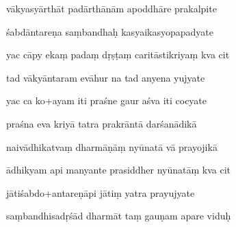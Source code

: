 \documentclass[article,12pt,a4paper]{memoir}%
\newcounter{parCount}
\begin{document}
	  
	  \pstart {} vākyasyārthāt padārthānām apoddhāre prakalpite 
	{}
	\pend%
      

	  
	  \pstart \leavevmode%
	śabdāntareṇa saṃbandhaḥ kasyaikasyopapadyate 
	{}
	\pend%
      

	  
	  \pstart {} yac cāpy ekaṃ padaṃ dṛṣṭaṃ caritāstikriyaṃ kva cit 
	{}
	\pend%
      

	  
	  \pstart \leavevmode%
	tad vākyāntaram evāhur na tad anyena yujyate 
	{}
	\pend%
      

	  
	  \pstart {} yac ca ko+ayam iti praśne gaur aśva iti cocyate 
	{}
	\pend%
      

	  
	  \pstart \leavevmode%
	praśna eva kriyā tatra prakrāntā darśanādikā 
	{}
	\pend%
      

	  
	  \pstart {} naivādhikatvaṃ dharmāṇāṃ nyūnatā vā prayojikā 
	{}
	\pend%
      

	  
	  \pstart \leavevmode%
	ādhikyam api manyante prasiddher nyūnatāṃ kva cit 
	{}
	\pend%
      

	  
	  \pstart {} jātiśabdo+antareṇāpi jātiṃ yatra prayujyate 
	{}
	\pend%
      

	  
	  \pstart \leavevmode%
	saṃbandhisadṛśād dharmāt taṃ gauṇam apare viduḥ 
	{}
	\pend%
      
\end{document}
